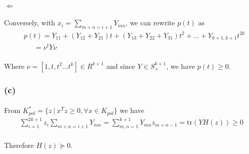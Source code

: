 \paragraph{}
$\Leftarrow$
\paragraph{}
Conversely, with $x_i=\sum_{m+n=i+1}Y_{mn}$, we can rewrite $p(t)$ as
\begin{align*}
&p(t)= Y_{11} + (Y_{12}+Y_{21})t +(Y_{13}+Y_{22}+Y_{31})t^2 +...+Y_{k+1,k+1}t^{2k} \\
&\quad \ \  = \nu^tY\nu
\end{align*}
\paragraph{}
Where $\nu=[1, t, t^2 ... t^k] \in R^{k+1}$ and since $Y\in S_+^{k+1}$, we have $p(t) \geq 0$.
\subsubsection*{(c)}
\paragraph{}
From $K^{\ast}_{pol}=\{z \ | \ x^Tz \geq 0, \forall x\in K_{pol}\}$ we have
\begin{align*}
	\sum_{i=1}^{2k+1}z_i\sum_{m+n=i+1}Y_{mn}=\sum_{m,n=1}^{k+1}Y_{mn}z_{m+n-1}=\text{tr}(YH(z)) \geq 0	
\end{align*}
\paragraph{}
Therefore $H(z)\succeq 0$.
